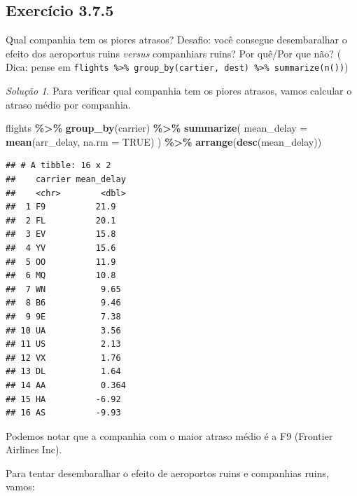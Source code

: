 \documentclass[
]{latex/krantz}
\newenvironment{Shaded}{\begin{snugshade}}{\end{snugshade}}
\newcommand{\AttributeTok}[1]{\textcolor[rgb]{0.13,0.29,0.53}{#1}}
\newcommand{\ConstantTok}[1]{\textcolor[rgb]{0.56,0.35,0.01}{#1}}
\newcommand{\FunctionTok}[1]{\textcolor[rgb]{0.13,0.29,0.53}{\textbf{#1}}}
\newcommand{\NormalTok}[1]{#1}
\newcommand{\SpecialCharTok}[1]{\textcolor[rgb]{0.81,0.36,0.00}{\textbf{#1}}}
\theoremstyle{definition}
\theoremstyle{definition}
\theoremstyle{definition}
\theoremstyle{definition}
\theoremstyle{remark}
\newtheorem*{solution}{Solução}
\begin{document}
\hypertarget{exr3-7-5}{%
\subsection*{Exercício 3.7.5}\label{exr3-7-5}}

Qual companhia tem os piores atrasos? Desafio: você consegue desembaralhar o efeito dos aeroportus ruins \emph{versus} companhiars ruins? Por quê/Por que não? ( Dica: pense em \texttt{flights\ \%\textgreater{}\%\ group\_by(cartier,\ dest)\ \%\textgreater{}\%\ summarize(n())})

\begin{solution}
Para verificar qual companhia tem os piores atrasos, vamos calcular o atraso médio por companhia.

\begin{Shaded}
\begin{Highlighting}[]
\NormalTok{flights }\SpecialCharTok{\%\textgreater{}\%} 
    \FunctionTok{group\_by}\NormalTok{(carrier) }\SpecialCharTok{\%\textgreater{}\%} 
    \FunctionTok{summarize}\NormalTok{(}
        \AttributeTok{mean\_delay =} \FunctionTok{mean}\NormalTok{(arr\_delay, }\AttributeTok{na.rm =} \ConstantTok{TRUE}\NormalTok{)}
\NormalTok{    ) }\SpecialCharTok{\%\textgreater{}\%}
    \FunctionTok{arrange}\NormalTok{(}\FunctionTok{desc}\NormalTok{(mean\_delay))}
\end{Highlighting}
\end{Shaded}

\begin{verbatim}
## # A tibble: 16 x 2
##    carrier mean_delay
##    <chr>        <dbl>
##  1 F9          21.9  
##  2 FL          20.1  
##  3 EV          15.8  
##  4 YV          15.6  
##  5 OO          11.9  
##  6 MQ          10.8  
##  7 WN           9.65 
##  8 B6           9.46 
##  9 9E           7.38 
## 10 UA           3.56 
## 11 US           2.13 
## 12 VX           1.76 
## 13 DL           1.64 
## 14 AA           0.364
## 15 HA          -6.92 
## 16 AS          -9.93
\end{verbatim}

Podemos notar que a companhia com o maior atraso médio é a F9 (Frontier Airlines Inc).

Para tentar desembaralhar o efeito de aeroportos ruins e companhias ruins, vamos:


\end{solution}
\end{document}

